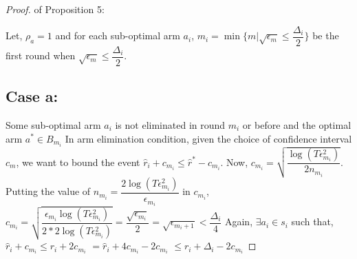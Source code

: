 \begin{proof} of Proposition 5:

Let, $\rho_{a}=1$ and for each sub-optimal arm $a_{i}$, $m_{i}=\min{\lbrace m|\sqrt{\epsilon_{m}}\leq \dfrac{\Delta_{i}}{2} \rbrace}$ be the first round when $\sqrt{\epsilon_{m}}\leq \dfrac{\Delta_{i}}{2}$.

\subsection{Case a:} 
Some sub-optimal arm $a_{i}$ is not eliminated in round $m_{i}$ or before and the optimal arm $a^{*}\in B_{m_{i}}$
\newline In arm elimination condition, given the choice of confidence interval $c_{m}$, we want to bound the event $\hat{r}_{i}+c_{m_{i}}\leq \hat{r}^{*}-c_{m_{i}}$. 
\newline Now, $c_{m_{i}}=\sqrt{\dfrac{\log (T\epsilon_{m_{i}}^{2})}{2 n_{m_{i}}}}$.
\newline Putting the value of $n_{m_{i}}=\dfrac{2\log{(T\epsilon_{m_{i}}^{2})}}{\epsilon_{m_{i}}}$ in $c_{m_{i}}$,
\newline $c_{m_{i}}=\sqrt{\dfrac{\epsilon_{m_{i}}\log (T\epsilon_{m_{i}}^{2})}{2*2 \log(T\epsilon_{m_{i}}^{2})}}=\dfrac{\sqrt{\epsilon_{m_{i}}}}{2} = \sqrt{\epsilon_{m_{i}+1}} < \dfrac{\Delta_{i}}{4} $
\newline Again, $\exists a_{i} \in s_{i}$ such that, 
$\hat{r}_{i} + c_{m_{i}}\leq r_{i} + 2c_{m_{i}} $
\newline\hspace*{14em}$= \hat{r}_{i} + 4c_{m_{i}} - 2c_{m_{i}} $
\newline\hspace*{14em}$\leq r_{i} + \Delta_{i} - 2c_{m_{i}}$

\end{proof}
